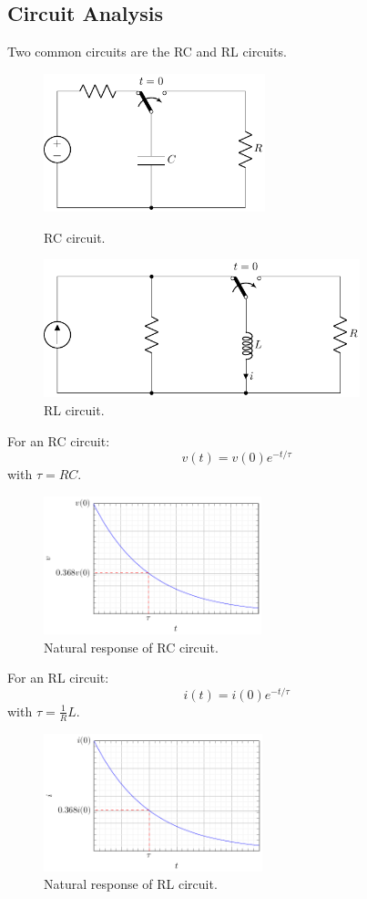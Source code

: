 \documentclass{article}
\begin{document}
\subsection{Circuit Analysis}
Two common circuits are the RC and RL circuits.
\begin{figure}[H]
    \centering
    \includegraphics[height = 4cm]{figures/rc_natural.pdf}
    \caption{RC circuit.} %
    \includegraphics[height = 4cm]{figures/rl_natural.pdf}
    \caption{RL circuit.} %
\end{figure}
For an RC circuit:
\begin{equation*}
    v\left( t \right) = v\left( 0 \right) e^{-t/\tau}
\end{equation*}
with \(\tau = RC\).
\begin{figure}[H]
    \centering
    \includegraphics[height = 4cm]{figures/rc_natural_plot.pdf}
    \caption{Natural response of RC circuit.} %
\end{figure}
For an RL circuit:
\begin{equation*}
    i\left( t \right) = i\left( 0 \right) e^{-t/\tau}
\end{equation*}
with \(\tau = \frac{1}{R}L\).
\begin{figure}[H]
    \centering
    \includegraphics[height = 4cm]{figures/rl_natural_plot.pdf}
    \caption{Natural response of RL circuit.} %
\end{figure}
\end{document}

